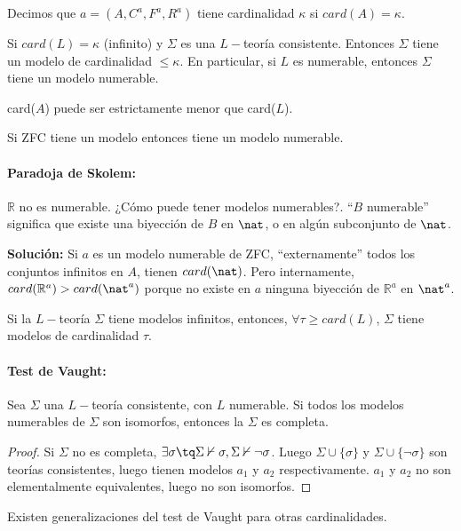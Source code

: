 \begin{defn}[Cardinalidad]
	Decimos que $a=(A, C^a, F^a, R^a)$ tiene cardinalidad $\kappa$ si $card(A) = \kappa$.
\end{defn}

\begin{theorem}
Si $card(L)=\kappa$ (infinito) y $\Sigma$ es una $L-$teoría consistente. Entonces $\Sigma$ tiene un modelo de cardinalidad $\le \kappa$. En particular, si $L$ es numerable, entonces $\Sigma$ tiene un modelo numerable.
\end{theorem}

\obs card($A$) puede ser estrictamente menor que card($L$).

\begin{corol}
Si ZFC tiene un modelo entonces tiene un modelo numerable.
\end{corol}

\paragraph{Paradoja de Skolem:} $\mathbb{R}$ no es numerable. ¿Cómo puede tener modelos numerables?. ``$B$ numerable'' significa que existe una biyección de $B$ en $\nat$, o en algún subconjunto de $\nat$.

\textbf{Solución: } Si $a$ es un modelo numerable de ZFC, ``externamente'' todos los conjuntos infinitos en $A$, tienen $card(\nat)$. Pero internamente, $card(\mathbb{R}^a) > card(\nat^a)$ porque no existe en $a$ ninguna biyección de $\mathbb{R}^a$ en $\nat^a$.

\begin{theorem}
	Si la $L-$teoría $\Sigma$ tiene modelos infinitos, entonces, $\forall \tau \ge card(L)$, $\Sigma$ tiene modelos de cardinalidad $\tau$.
\end{theorem}

\paragraph{Test de Vaught:} Sea $\Sigma$ una $L-$teoría consistente, con $L$ numerable. Si todos los modelos numerables de $\Sigma$ son isomorfos, entonces la $\Sigma$ es completa. 
\begin{proof}
	Si $\Sigma$ no es completa, $\exists \sigma \tq \Sigma \nvdash \sigma , \Sigma \nvdash \neg\sigma$. Luego $\Sigma \cup \{\sigma\}$ y $\Sigma \cup \{\neg\sigma\}$ son teorías consistentes, luego tienen modelos $a_1$ y $a_2$ respectivamente. $a_1$ y $a_2$ no son elementalmente equivalentes, luego no son isomorfos.
\end{proof}
\begin{obs}
	Existen generalizaciones del test de Vaught para otras cardinalidades.
\end{obs}